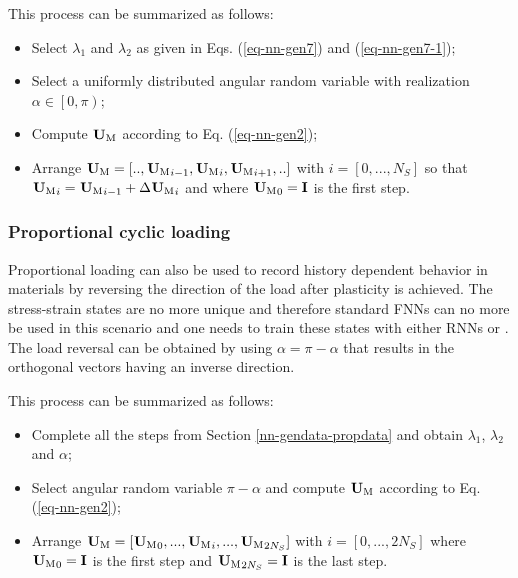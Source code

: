 This process can be summarized as follows:
\begin{itemize}
	\item Select $ \lambda_1 $ and $ \lambda_2 $ as given in Eqs. (\ref{eq-nn-gen7}) and (\ref{eq-nn-gen7-1});
	\item Select a uniformly distributed angular random variable with realization $ \alpha\in\left[0,\pi\right) $;
	\item Compute $ \tgm[]{U} $ according to Eq. (\ref{eq-nn-gen2});
	\item Arrange $ \tgm[]{U}=\left[..,{\tgm[]{U}}_{i-1},{\tgm[]{U}}_{i},{\tgm[]{U}}_{i+1},..\right]$ with $ i=\left[0,...,N_S\right] $ so that ${\tgm[]{U}}_{i}={\tgm[]{U}}_{i-1}+\Delta{\tgm[]{U}}_i $ and where $ {\tgm[]{U}}_0=\textbf{I} $ is the first step.
\end{itemize}

\subsubsection{Proportional cyclic loading}\label{nn-gendata-cycdata}
Proportional loading can also be used to record history dependent behavior in materials by reversing the direction of the load after plasticity is achieved. The stress-strain states are no more unique and therefore standard FNNs can no more be used in this scenario and one needs to train these states with either RNNs or \fnn. The load reversal can be obtained by using $ \alpha = \pi-\alpha $ that results in the orthogonal vectors having an inverse direction.

This process can be summarized as follows:
\begin{itemize}
	\item Complete all the steps from Section \ref{nn-gendata-propdata} and obtain $ \lambda_1 $, $ \lambda_2 $ and $ \alpha $;
	\item Select angular random variable $ \pi-\alpha $ and compute $ \tgm[]{U} $ according to Eq. (\ref{eq-nn-gen2});
	\item Arrange $ \tgm[]{U}=\left[{\tgm[]{U}}_0,...,{\tgm[]{U}}_{i},...,{\tgm{U}}_{2N_S}\right]$ with $ i=\left[0,...,2N_S\right] $ where $ {\tgm[]{U}}_0=\textbf{I} $ is the first step and $ {\tgm[]{U}}_{2N_S}=\textbf{I} $ is the last step.
\end{itemize}

